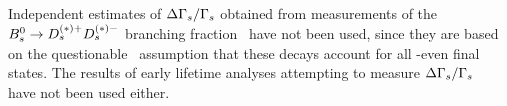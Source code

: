 Independent estimates of $\Delta\Gamma_{s}/\Gamma_{s}$ obtained from measurements of the 
$B^0_s \to D_s^{(*)+} D_s^{(*)-}$ branching fraction~\cite{Barate:2000kd,Esen:2010jq_mod,Abazov:2008ig,*Abazov:2007rb_mod_cont,Abulencia:2007zz}
have not been used,
since they are based on the questionable~\cite{Lenz:2011ti,*Lenz:2006hd}
assumption that these decays account for all \CP-even final states.
The results of early lifetime analyses attempting
to measure $\Delta\Gamma_{s}/\Gamma_{s}$~\cite{Acciarri:1998uv,Abreu:2000sh,Abreu:2000ev,Abe:1997bd}
have not been used either. 











 
%

